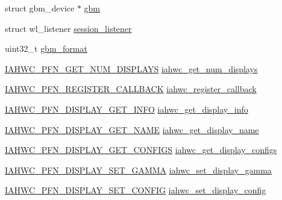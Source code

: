 \begin{DoxyCompactItemize}
\begin{tabbing}
\end{tabbing}\item 
struct gbm\+\_\+device $\ast$ \mbox{\hyperlink{structiahwc__backend_a7e7a9ad912e8a70a7e87a6c571583953}{gbm}}
\item 
struct wl\+\_\+listener \mbox{\hyperlink{structiahwc__backend_a12f886ff09a8cbe3c0e59537cc17c237}{session\+\_\+listener}}
\item 
uint32\+\_\+t \mbox{\hyperlink{structiahwc__backend_a983b85b4da49b9cfaa8c2bb2d1a96660}{gbm\+\_\+format}}
\item 
\mbox{\hyperlink{iahwc_8h_ac94a67ed01b360e5d07e47e73666d01a}{I\+A\+H\+W\+C\+\_\+\+P\+F\+N\+\_\+\+G\+E\+T\+\_\+\+N\+U\+M\+\_\+\+D\+I\+S\+P\+L\+A\+YS}} \mbox{\hyperlink{structiahwc__backend_a6ee376e76dc4568bba993f155a977bd5}{iahwc\+\_\+get\+\_\+num\+\_\+displays}}
\item 
\mbox{\hyperlink{iahwc_8h_a6cf69c9a3a26fbdf5fec62d16485e5cf}{I\+A\+H\+W\+C\+\_\+\+P\+F\+N\+\_\+\+R\+E\+G\+I\+S\+T\+E\+R\+\_\+\+C\+A\+L\+L\+B\+A\+CK}} \mbox{\hyperlink{structiahwc__backend_a0a12d7395fba844cdfd4ffc2093e80fe}{iahwc\+\_\+register\+\_\+callback}}
\item 
\mbox{\hyperlink{iahwc_8h_a79bdf92b174300d2af098db065a6f0fd}{I\+A\+H\+W\+C\+\_\+\+P\+F\+N\+\_\+\+D\+I\+S\+P\+L\+A\+Y\+\_\+\+G\+E\+T\+\_\+\+I\+N\+FO}} \mbox{\hyperlink{structiahwc__backend_a85bf879c1fbd6ad3c4b60093fd81fd8f}{iahwc\+\_\+get\+\_\+display\+\_\+info}}
\item 
\mbox{\hyperlink{iahwc_8h_ad2adbed7924879769d74abf89313f6d6}{I\+A\+H\+W\+C\+\_\+\+P\+F\+N\+\_\+\+D\+I\+S\+P\+L\+A\+Y\+\_\+\+G\+E\+T\+\_\+\+N\+A\+ME}} \mbox{\hyperlink{structiahwc__backend_acd2af93ffe7dd200b432b95e9f74552e}{iahwc\+\_\+get\+\_\+display\+\_\+name}}
\item 
\mbox{\hyperlink{iahwc_8h_a2dfc704af6f663d2fdec94baa5192687}{I\+A\+H\+W\+C\+\_\+\+P\+F\+N\+\_\+\+D\+I\+S\+P\+L\+A\+Y\+\_\+\+G\+E\+T\+\_\+\+C\+O\+N\+F\+I\+GS}} \mbox{\hyperlink{structiahwc__backend_a8c8b683d490c99df7dbd5f0080cb7728}{iahwc\+\_\+get\+\_\+display\+\_\+configs}}
\item 
\mbox{\hyperlink{iahwc_8h_a3f83a3da3341f6a8f0379f326cd909b6}{I\+A\+H\+W\+C\+\_\+\+P\+F\+N\+\_\+\+D\+I\+S\+P\+L\+A\+Y\+\_\+\+S\+E\+T\+\_\+\+G\+A\+M\+MA}} \mbox{\hyperlink{structiahwc__backend_a7788f472f5cdadb4dc8e620eadfd264d}{iahwc\+\_\+set\+\_\+display\+\_\+gamma}}
\item 
\mbox{\hyperlink{iahwc_8h_afcb6a612f77fca2fc5d6f1c80d8e2f78}{I\+A\+H\+W\+C\+\_\+\+P\+F\+N\+\_\+\+D\+I\+S\+P\+L\+A\+Y\+\_\+\+S\+E\+T\+\_\+\+C\+O\+N\+F\+IG}} \mbox{\hyperlink{structiahwc__backend_abe716daeccdcb10684aa103a5f8d0f7c}{iahwc\+\_\+set\+\_\+display\+\_\+config}}

\end{DoxyCompactItemize}
